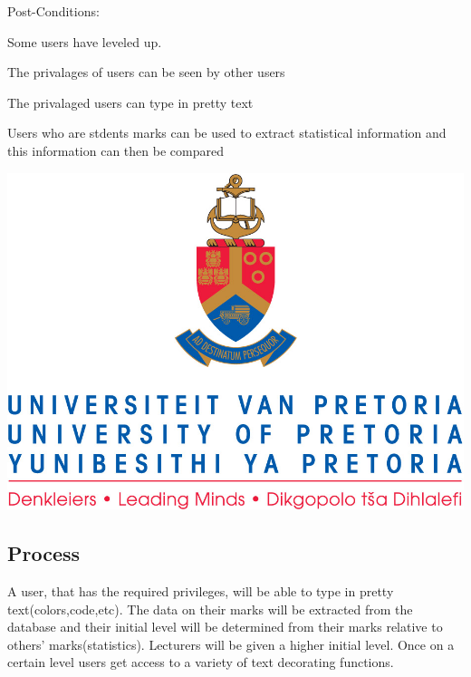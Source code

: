 \documentclass[a4paper,12pt]{article}
\begin{document}
Post-Conditions:
\begin{list_type}

\item Some users have leveled up.
\item The privalages of users can be seen by other users
\item The privalaged users can type in pretty text
\item Users who are stdents marks can be used to extract statistical information and this information can then be compared
\end{list_type}
      
    \includegraphics{images/UPlogo}


\subsection{Process}
A user, that has the required privileges, will be able to type in pretty text(colors,code,etc). The data on their marks will be extracted from the database and their initial level will be determined from their marks relative to others' marks(statistics). Lecturers will be given a higher initial level. Once on a certain level users get access to a variety of text decorating functions.
 
 
\end{document}
